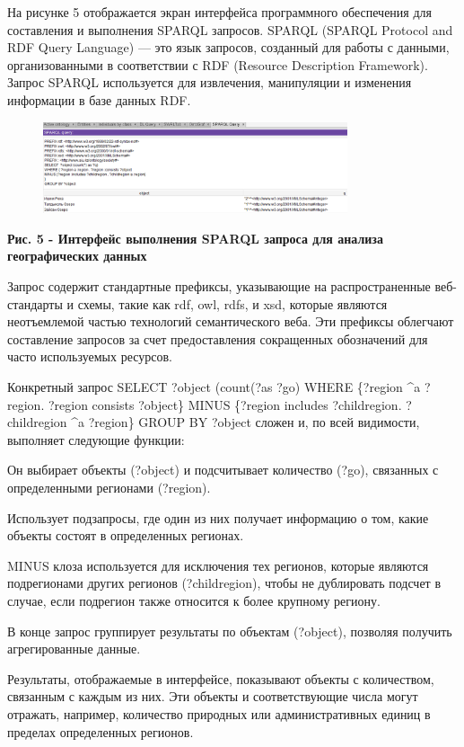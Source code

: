 На рисунке 5 отображается экран интерфейса программного обеспечения для
составления и выполнения SPARQL запросов. SPARQL (SPARQL Protocol and
RDF Query Language) --- это язык запросов, созданный для работы с
данными, организованными в соответствии с RDF (Resource Description
Framework). Запрос SPARQL используется для извлечения, манипуляции и
изменения информации в базе данных RDF.

\begin{figure}[H]
	\centering
	\includegraphics[width=0.8\textwidth]{assets/42}
	\caption*{}
\end{figure}

\textbf{Рис. 5 - Интерфейс выполнения SPARQL запроса для анализа
географических данных}

Запрос содержит стандартные префиксы, указывающие на распространенные
веб-стандарты и схемы, такие как rdf, owl, rdfs, и xsd, которые являются
неотъемлемой частью технологий семантического веба. Эти префиксы
облегчают составление запросов за счет предоставления сокращенных
обозначений для часто используемых ресурсов.

Конкретный запрос SELECT ?object (count(?as ?go) WHERE \{?region \^{}a
?region. ?region consists ?object\} MINUS \{?region includes
?childregion. ?childregion \^{}a ?region\} GROUP BY ?object сложен и, по
всей видимости, выполняет следующие функции:

Он выбирает объекты (?object) и подсчитывает количество (?go), связанных
с определенными регионами (?region).

Использует подзапросы, где один из них получает информацию о том, какие
объекты состоят в определенных регионах.

MINUS клоза используется для исключения тех регионов, которые являются
подрегионами других регионов (?childregion), чтобы не дублировать
подсчет в случае, если подрегион также относится к более крупному
региону.

В конце запрос группирует результаты по объектам (?object), позволяя
получить агрегированные данные.

Результаты, отображаемые в интерфейсе, показывают объекты с количеством,
связанным с каждым из них. Эти объекты и соответствующие числа могут
отражать, например, количество природных или административных единиц в
пределах определенных регионов.

